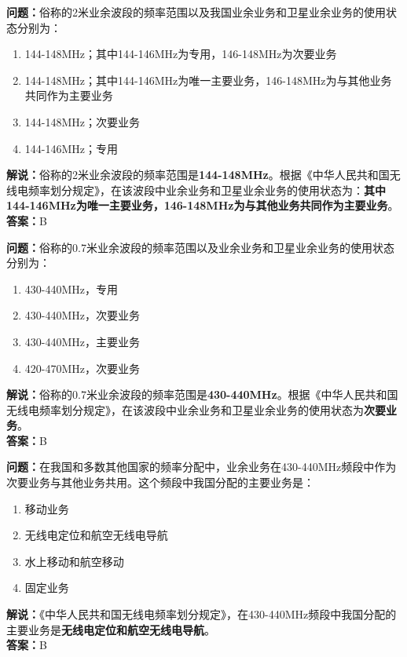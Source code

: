 \bigskip


\noindent\textbf{问题：}俗称的2米业余波段的频率范围以及我国业余业务和卫星业余业务的使用状态分别为：
\begin{enumerate}[label=\Alph*), leftmargin=3em]
  \item 144-148MHz；其中144-146MHz为专用，146-148MHz为次要业务
  \item 144-148MHz；其中144-146MHz为唯一主要业务，146-148MHz为与其他业务共同作为主要业务
  \item 144-148MHz；次要业务
  \item 144-146MHz；专用
\end{enumerate}
\noindent\textbf{解说：}俗称的2米业余波段的频率范围是\textbf{144-148MHz}。根据《中华人民共和国无线电频率划分规定》，在该波段中业余业务和卫星业余业务的使用状态为：\textbf{其中144-146MHz为唯一主要业务，146-148MHz为与其他业务共同作为主要业务}。\\\noindent\textbf{答案：}B


\bigskip


\noindent\textbf{问题：}俗称的0.7米业余波段的频率范围以及业余业务和卫星业余业务的使用状态分别为：
\begin{enumerate}[label=\Alph*), leftmargin=3em]
  \item 430-440MHz，专用
  \item 430-440MHz，次要业务
  \item 430-440MHz，主要业务
  \item 420-470MHz，次要业务
\end{enumerate}
\noindent\textbf{解说：}俗称的0.7米业余波段的频率范围是\textbf{430-440MHz}。根据《中华人民共和国无线电频率划分规定》，在该波段中业余业务和卫星业余业务的使用状态为\textbf{次要业务}。\\\noindent\textbf{答案：}B


\bigskip


\noindent\textbf{问题：}在我国和多数其他国家的频率分配中，业余业务在430-440MHz频段中作为次要业务与其他业务共用。这个频段中我国分配的主要业务是：
\begin{enumerate}[label=\Alph*), leftmargin=3em]
  \item 移动业务
  \item 无线电定位和航空无线电导航
  \item 水上移动和航空移动
  \item 固定业务
\end{enumerate}
\noindent\textbf{解说：}《中华人民共和国无线电频率划分规定》，在430-440MHz频段中我国分配的主要业务是\textbf{无线电定位和航空无线电导航}。\\\noindent\textbf{答案：}B



